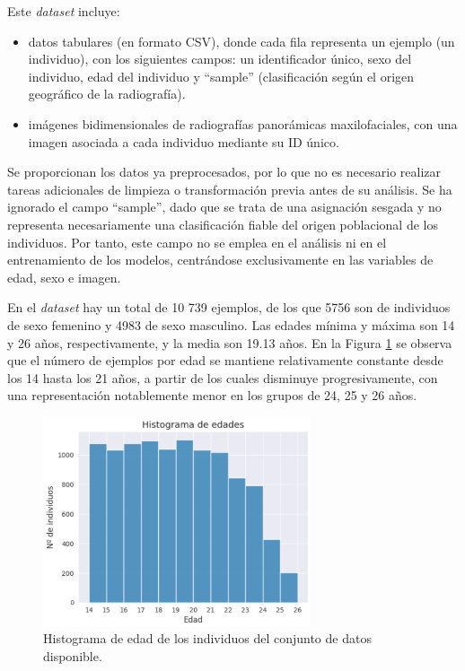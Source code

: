 Este \textit{dataset} incluye:

\begin{itemize}

    \item datos tabulares (en formato CSV), donde cada fila representa un ejemplo (un individuo), con los siguientes campos: un identificador único, sexo del individuo, edad del individuo y ``sample'' (clasificación según el origen geográfico de la radiografía).

    \item imágenes bidimensionales de radiografías panorámicas maxilofaciales, con una imagen asociada a cada individuo mediante su ID único. 

\end{itemize}

Se proporcionan los datos ya preprocesados, por lo que no es necesario realizar tareas adicionales de limpieza o transformación previa antes de su análisis. Se ha ignorado el campo ``sample'', dado que se trata de una asignación sesgada y no representa necesariamente una clasificación fiable del origen poblacional de los individuos. Por tanto, este campo no se emplea en el análisis ni en el entrenamiento de los modelos, centrándose exclusivamente en las variables de edad, sexo e imagen.

En el \textit{dataset} hay un total de 10 739 ejemplos, de los que 5756 son de individuos de sexo femenino y 4983 de sexo masculino. Las edades mínima y máxima son 14 y 26 años, respectivamente, y la media son 19.13 años. En la Figura \ref{fig:histogram_ages} se observa que el número de ejemplos por edad se mantiene relativamente constante desde los 14 hasta los 21 años, a partir de los cuales disminuye progresivamente, con una representación notablemente menor en los grupos de 24, 25 y 26 años.
 
\begin{figure}[htbp]
    \centering
    \includegraphics[width=0.7\textwidth]{capitulos/cap_04/imagenes/histogram_ages.png}
    \caption[
        Histograma de edad de los individuos del conjunto de datos disponible.
    ]{
        Histograma de edad de los individuos del conjunto de datos disponible. 
    } 
    \label{fig:histogram_ages}
\end{figure}

